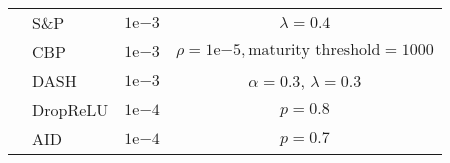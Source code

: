 \begin{table}[p]
\begin{tabular}{l|l|c|c}
        &S\&P                    & $1\mathrm{e}{-3}$ & $\lambda = 0.4$ \\
        &CBP                     & $1\mathrm{e}{-3}$ & $\rho = 1\mathrm{e}{-5}, \text{maturity threshold} = 1000$ \\
        &DASH                    & $1\mathrm{e}{-3}$ & $\alpha=0.3$, $\lambda=0.3$ \\
        &DropReLU                & $1\mathrm{e}{-4}$ & $p = 0.8$ \\
        &AID                     & $1\mathrm{e}{-4}$ & $p=0.7$ \\
        \bottomrule
    \end{tabular}
    \label{tab:hyperparameter_class_incremental}
\end{table}



